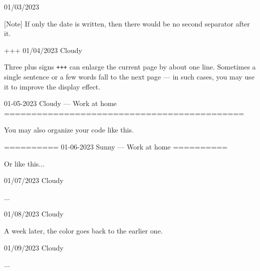 \documentclass[11pt, paperstyle=light yellow, color entry, month-day-year,
  title in boldface, title in sffamily, use style = classical]{jwjournal}
\begin{document}
01/03/2023

  [Note] If only the date is written, then there would be no second separator after it.


+++
01/04/2023  Cloudy

  Three plus signs \texttt{+++} can enlarge the current page by about one line. Sometimes a single sentence or a few words fall to the next page --- in such cases, you may use it to improve the display effect.



01-05-2023    Cloudy        --- Work at home
============================================

You may also organize your code like this.


==========
01-06-2023    Sunny         --- Work at home
==========

Or like this...



01/07/2023  Cloudy

  ...



01/08/2023  Cloudy

  A week later, the color goes back to the earlier one.



01/09/2023  Cloudy

  ...
\end{document}
